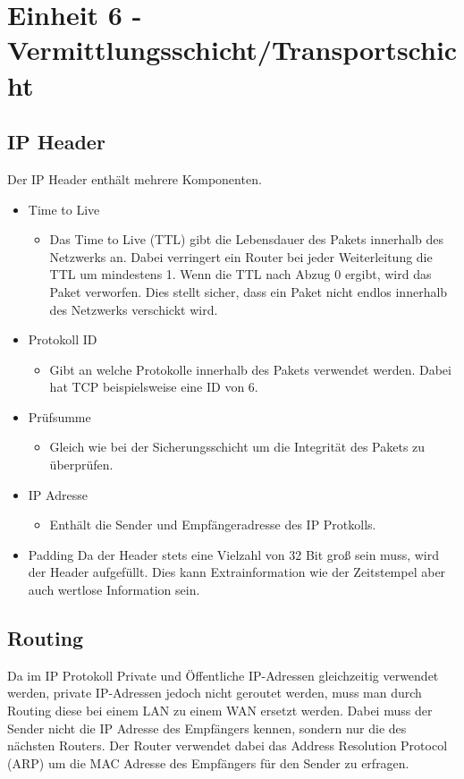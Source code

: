 \documentclass{article}
\begin{document}
	 \section{Einheit 6 - Vermittlungsschicht/Transportschicht}
	 \subsection{IP Header}
	 Der IP Header enthält mehrere Komponenten.
	 \begin{itemize}
	 	\item{Time to Live}
	 	\begin{itemize}
	 		\item{Das Time to Live (TTL) gibt die Lebensdauer des Pakets innerhalb des Netzwerks an. Dabei verringert ein Router bei jeder Weiterleitung die TTL um mindestens 1. Wenn die TTL nach Abzug 0 ergibt, wird das Paket verworfen. Dies stellt sicher, dass ein Paket nicht endlos innerhalb des Netzwerks verschickt wird. }
	 	\end{itemize}
	 	\item{Protokoll ID}
	 	\begin{itemize}
	 		\item{Gibt an welche Protokolle innerhalb des Pakets verwendet werden. Dabei hat TCP beispielsweise eine ID von 6.}
	 	\end{itemize}
	 	\item{Prüfsumme}
	 	\begin{itemize}
	 		\item{Gleich wie bei der Sicherungsschicht um die Integrität des Pakets zu überprüfen.}
	 	\end{itemize}
	 	\item{IP Adresse}
	 	\begin{itemize}
	 		\item{Enthält die Sender und Empfängeradresse des IP Protkolls.}
	 	\end{itemize}
	 	\item{Padding}
	 	Da der Header stets eine Vielzahl von 32 Bit groß sein muss, wird der Header aufgefüllt. Dies kann Extrainformation wie der Zeitstempel aber auch wertlose Information sein.
	 \end{itemize}
	 \subsection{Routing}
	 Da im IP Protokoll Private und Öffentliche IP-Adressen gleichzeitig verwendet werden, private IP-Adressen jedoch nicht geroutet werden, muss man durch Routing diese bei einem LAN zu einem WAN ersetzt werden. Dabei muss der Sender nicht die IP Adresse des Empfängers kennen, sondern nur die des nächsten Routers. Der Router verwendet dabei das Address Resolution Protocol (ARP) um die MAC Adresse des Empfängers für den Sender zu erfragen. \\
\end{document}
